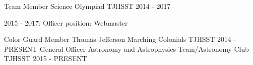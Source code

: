 \begin{cventries}
  \cventry
    {Team Member}
    {Science Olympiad}
    {TJHSST}
    {2014 - 2017}
    {
        \begin{cvitems}
            \item{2015 - 2017: Officer position: Webmaster}
        \end{cvitems}
    }
  \cventry
    {Color Guard Member}
    {Thomas Jefferson Marching Colonials}
    {TJHSST}
    {2014 - PRESENT}
    {}
    \cventry
    {General Officer}
    {Astronomy and Astrophysics Team/Astronomy Club}
    {TJHSST}
    {2015 - PRESENT}
    {}
\end{cventries}
